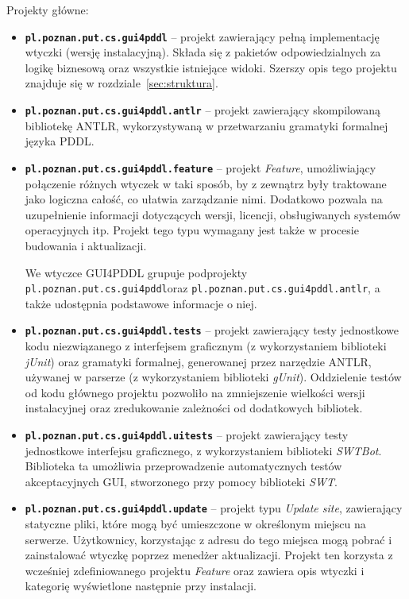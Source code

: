 Projekty główne:
\begin{itemize}
\item \textbf{\texttt{pl.poznan.put.cs.gui4pddl}} -- projekt zawierający pełną implementację wtyczki (wersję instalacyjną). Składa się z pakietów odpowiedzialnych za logikę biznesową oraz wszystkie istniejące widoki. Szerszy opis tego projektu znajduje się w rozdziale~\ref{sec:struktura}.
\item \textbf{\texttt{pl.poznan.put.cs.gui4pddl.antlr}} -- projekt zawierający skompilowaną bibliotekę ANTLR, wykorzystywaną w przetwarzaniu gramatyki formalnej języka PDDL.
\item \textbf{\texttt{pl.poznan.put.cs.gui4pddl.feature}} -- projekt \textit{Feature}, umożliwiający połączenie różnych wtyczek w taki sposób, by z zewnątrz były traktowane jako logiczna całość, co ułatwia zarządzanie nimi. Dodatkowo pozwala na uzupełnienie informacji dotyczących wersji, licencji, obsługiwanych systemów operacyjnych itp. Projekt tego typu wymagany jest także w procesie budowania i aktualizacji.

We wtyczce GUI4PDDL grupuje podprojekty \texttt{pl.poznan.put.cs.gui4pddl}\linebreak oraz \texttt{pl.poznan.put.cs.gui4pddl.antlr}, a także udostępnia podstawowe informacje o niej.
\item \textbf{\texttt{pl.poznan.put.cs.gui4pddl.tests}} -- projekt zawierający testy jednostkowe kodu niezwiązanego z interfejsem graficznym (z wykorzystaniem biblioteki \textit{jUnit}) oraz gramatyki formalnej, generowanej przez narzędzie ANTLR, używanej w parserze (z wykorzystaniem biblioteki \textit{gUnit}). Oddzielenie testów od kodu głównego projektu pozwoliło na zmniejszenie wielkości wersji instalacyjnej oraz zredukowanie zależności od dodatkowych bibliotek.
\item \textbf{\texttt{pl.poznan.put.cs.gui4pddl.uitests}} -- projekt zawierający testy jednostkowe interfejsu graficznego, z wykorzystaniem biblioteki \textit{SWTBot}. Biblioteka ta umożliwia przeprowadzenie automatycznych testów akceptacyjnych GUI, stworzonego przy pomocy biblioteki \textit{SWT}.
\item \textbf{\texttt{pl.poznan.put.cs.gui4pddl.update}} -- projekt typu \textit{Update site}, zawierający statyczne pliki, które mogą być umieszczone w określonym miejscu na serwerze. Użytkownicy, korzystając z adresu do tego miejsca mogą pobrać i zainstalować wtyczkę poprzez menedżer aktualizacji. Projekt ten korzysta z wcześniej zdefiniowanego projektu \textit{Feature} oraz zawiera opis wtyczki i kategorię wyświetlone następnie przy instalacji.
\end{itemize}

